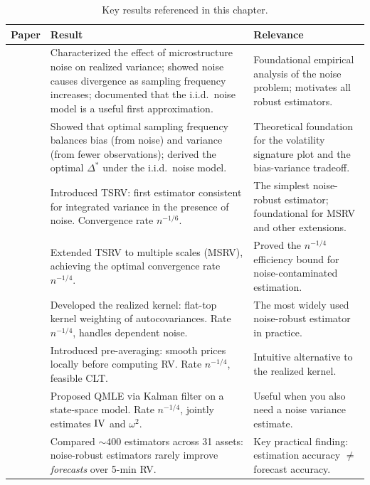 
\begin{table}[htbp]
\centering
\caption{Key results referenced in this chapter.}
\label{tab:ch03-key-results}
\begin{tabular}{@{} p{4.5cm} p{6cm} p{4cm} @{}}
\toprule
\textbf{Paper} & \textbf{Result} & \textbf{Relevance} \\
\midrule
\citet{HansenLunde2006} &
Characterized the effect of microstructure noise on realized variance; showed noise causes divergence as sampling frequency increases; documented that the i.i.d.\ noise model is a useful first approximation. &
Foundational empirical analysis of the noise problem; motivates all robust estimators. \\[6pt]

\citet{AitSahaliaMyklandZhang2005} &
Showed that optimal sampling frequency balances bias (from noise) and variance (from fewer observations); derived the optimal $\Delta^*$ under the i.i.d.\ noise model. &
Theoretical foundation for the volatility signature plot and the bias-variance tradeoff. \\[6pt]

\citet{ZhangMyklandAitSahalia2005} &
Introduced TSRV: first estimator consistent for integrated variance in the presence of noise. Convergence rate $n^{-1/6}$. &
The simplest noise-robust estimator; foundational for MSRV and other extensions. \\[6pt]

\citet{Zhang2006} &
Extended TSRV to multiple scales (MSRV), achieving the optimal convergence rate $n^{-1/4}$. &
Proved the $n^{-1/4}$ efficiency bound for noise-contaminated estimation. \\[6pt]

\citet{BNHLS2008} &
Developed the realized kernel: flat-top kernel weighting of autocovariances. Rate $n^{-1/4}$, handles dependent noise. &
The most widely used noise-robust estimator in practice. \\[6pt]

\citet{JacodLiMyklandPodolskijVetter2009} &
Introduced pre-averaging: smooth prices locally before computing RV. Rate $n^{-1/4}$, feasible CLT. &
Intuitive alternative to the realized kernel. \\[6pt]

\citet{Xiu2010} &
Proposed QMLE via Kalman filter on a state-space model. Rate $n^{-1/4}$, jointly estimates $\operatorname{IV}$ and $\omega^2$. &
Useful when you also need a noise variance estimate. \\[6pt]

\citet{LPS2015} &
Compared ${\sim}400$ estimators across 31 assets: noise-robust estimators rarely improve \emph{forecasts} over 5-min RV. &
Key practical finding: estimation accuracy $\neq$ forecast accuracy. \\
\bottomrule
\end{tabular}
\end{table}
